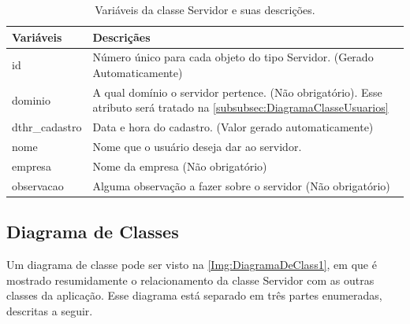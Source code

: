 \begin{table}[!ht]
\centering
\begin{tabular}{|l|l|}
\hline
{\color[HTML]{000000} \textbf{Variáveis}} & {\color[HTML]{000000} \textbf{Descriçães}}                                                                \\ \hline
id                                     & \multicolumn{1}{p{13.00cm}|}{Número único para cada objeto do tipo Servidor. (Gerado Automaticamente) }\\ \hline
dominio                                & \multicolumn{1}{p{13.00cm}|}{A qual domínio o servidor pertence. (Não obrigatório). Esse atributo será tratado na \autoref{subsubsec:DiagramaClasseUsuarios}} \\ \hline
dthr\_cadastro                         & \multicolumn{1}{p{13.00cm}|}{Data e hora do cadastro. (Valor gerado automaticamente)} \\ \hline
nome                                   & \multicolumn{1}{p{13.00cm}|}{Nome que o usuário deseja dar ao servidor.}  \\ \hline
empresa                                & \multicolumn{1}{p{13.00cm}|}{Nome da empresa (Não obrigatório)} \\ \hline
observacao                             & \multicolumn{1}{p{13.00cm}|}{Alguma observação a fazer sobre o servidor (Não obrigatório)} \\ \hline
\end{tabular}
\caption[Variáveis da classe Servidor e suas descrições.]{Variáveis da classe Servidor e suas descrições.}
\label{Tab:VariaveisServidor}
\end{table}


\subsection{Diagrama de Classes}\label{subsec:DiagramaDeClasses}

Um diagrama de classe pode ser visto na \autoref{Img:DiagramaDeClass1}, em que é mostrado resumidamente o relacionamento da classe Servidor com as outras classes da aplicação. Esse diagrama está separado em três partes enumeradas, descritas a seguir.

